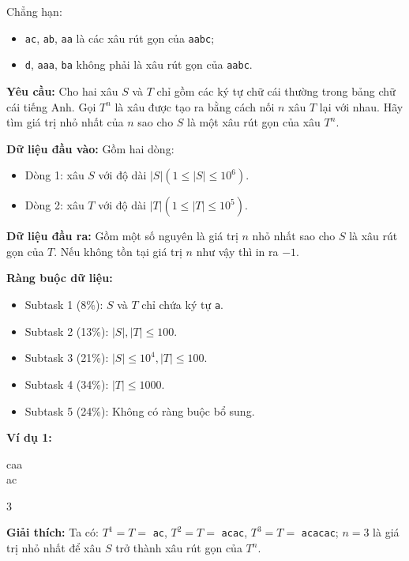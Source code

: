\documentclass[12pt]{scrartcl}  %
\begin{document}
Chẳng hạn:
\begin{itemize}
    \item \texttt{ac}, \texttt{ab}, \texttt{aa} là các xâu rút gọn của \texttt{aabc};
    \item \texttt{d}, \texttt{aaa}, \texttt{ba} không phải là xâu rút gọn của \texttt{aabc}.
\end{itemize}

\textbf{Yêu cầu:}
Cho hai xâu $S$ và $T$ chỉ gồm các ký tự chữ cái thường trong bảng chữ cái tiếng Anh. Gọi $T^n$ là xâu được tạo ra bằng cách nối $n$ xâu $T$ lại với nhau. 
Hãy tìm giá trị nhỏ nhất của $n$ sao cho $S$ là một xâu rút gọn của xâu $T^n$. 

\textbf{Dữ liệu đầu vào:}
Gồm hai dòng:
\begin{itemize}
    \item Dòng 1: xâu $S$ với độ dài $|S| (1 \leq |S| \leq 10^6)$.
    \item Dòng 2: xâu $T$ với độ dài $|T| (1 \leq |T| \leq 10^5)$.
\end{itemize}

\textbf{Dữ liệu đầu ra:}
Gồm một số nguyên là giá trị $n$ nhỏ nhất sao cho $S$ là xâu rút gọn của $T$. Nếu không tồn tại giá trị $n$ như vậy thì in ra $-1$.

\textbf{Ràng buộc dữ liệu:}
\begin{itemize}
    \item Subtask 1 (8\%): $S$ và $T$ chỉ chứa ký tự \texttt{a}.
    \item Subtask 2 (13\%): $|S|, |T| \leq 100$.
    \item Subtask 3 (21\%): $|S| \leq 10^4, |T| \leq 100$.
    \item Subtask 4 (34\%): $|T| \leq 1000$.
    \item Subtask 5 (24\%): Không có ràng buộc bổ sung.
\end{itemize}

\textbf{Ví dụ 1:}
\begin{tcolorbox}[colback=gray!5!white, colframe=blue!50!black, title=Input]
caa\\
ac
\end{tcolorbox}
\begin{tcolorbox}[colback=gray!5!white, colframe=green!50!black, title=Output]
3
\end{tcolorbox}

\textbf{Giải thích:}
Ta có: $T^1 = T =$ \texttt{ac}, $T^2 = T =$ \texttt{acac}, $T^3 = T =$ \texttt{acacac}; $n = 3$ là giá trị nhỏ nhất để xâu $S$ trở thành xâu rút gọn của $T^n$.
\end{document}
